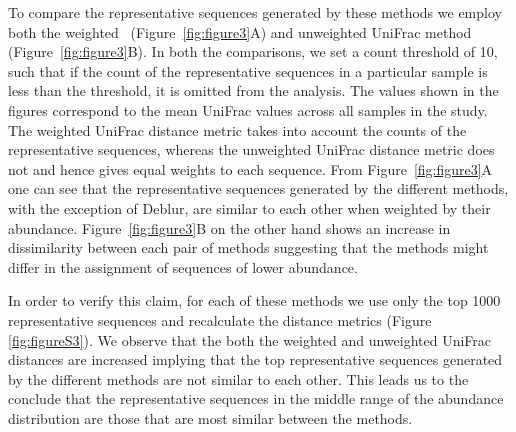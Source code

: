   To compare the representative sequences generated by these methods we employ both the weighted~\cite{Lozupone2007} (Figure~\ref{fig:figure3}A) and unweighted UniFrac method~\cite{Lozupone2005} (Figure~\ref{fig:figure3}B).
  In both the comparisons, we set a count threshold of 10, such that if the count of the representative sequences in a particular sample is less than the threshold, it is omitted from the analysis.
  The values shown in the figures correspond to the mean UniFrac values across all samples in the study.
  The weighted UniFrac distance metric takes into account the counts of the representative sequences, whereas the unweighted UniFrac distance metric does not and hence gives equal weights to each sequence.
  From Figure~\ref{fig:figure3}A one can see that the representative sequences generated by the different methods, with the exception of Deblur, are similar to each other when weighted by their abundance.
  Figure~\ref{fig:figure3}B on the other hand shows an increase in dissimilarity between each pair of methods suggesting that the methods might differ in the assignment of sequences of lower abundance.

  In order to verify this claim, for each of these methods we use only the top 1000 representative sequences and recalculate the distance metrics (Figure \ref{fig:figureS3}).
  We observe that the both the weighted and unweighted UniFrac distances are increased implying that the top representative sequences generated by the different methods are not similar to each other.
  This leads us to the conclude that the representative sequences in the middle range of the abundance distribution are those that are most similar between the methods.

